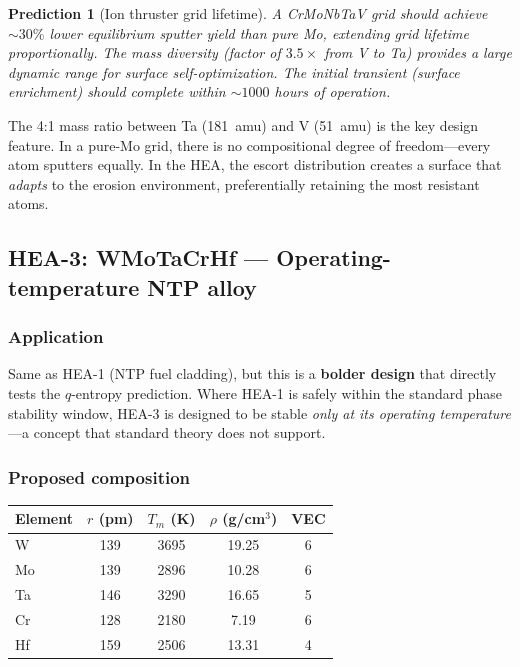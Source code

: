 \documentclass[12pt,letterpaper]{article}
\newtheorem{prediction}[theorem]{Prediction}
\theoremstyle{definition}
\begin{document}
\begin{prediction}[Ion thruster grid lifetime]
A CrMoNbTaV grid should achieve ${\sim}30\%$ lower equilibrium sputter yield than pure Mo, extending grid lifetime proportionally.  The mass diversity (factor of $3.5{\times}$ from V to Ta) provides a large dynamic range for surface self-optimization.  The initial transient (surface enrichment) should complete within ${\sim}1000$ hours of operation.
\end{prediction}

The 4:1 mass ratio between Ta (181~amu) and V (51~amu) is the key design feature.  In a pure-Mo grid, there is no compositional degree of freedom---every atom sputters equally.  In the HEA, the escort distribution creates a surface that \emph{adapts} to the erosion environment, preferentially retaining the most resistant atoms.


\subsection{HEA-3: WMoTaCrHf --- Operating-temperature NTP alloy}

\subsubsection{Application}

Same as HEA-1 (NTP fuel cladding), but this is a \textbf{bolder design} that directly tests the $q$-entropy prediction.  Where HEA-1 is safely within the standard phase stability window, HEA-3 is designed to be stable \emph{only at its operating temperature}---a concept that standard theory does not support.

\subsubsection{Proposed composition}

\begin{center}
\begin{tabular}{@{}lcccc@{}}
\toprule
Element & $r$ (pm) & $T_m$ (K) & $\rho$ (g/cm$^3$) & VEC \\
\midrule
W  & 139 & 3695 & 19.25 & 6 \\
Mo & 139 & 2896 & 10.28 & 6 \\
Ta & 146 & 3290 & 16.65 & 5 \\
Cr & 128 & 2180 & 7.19  & 6 \\
Hf & 159 & 2506 & 13.31 & 4 \\
\bottomrule
\end{tabular}
\end{center}
\end{document}
